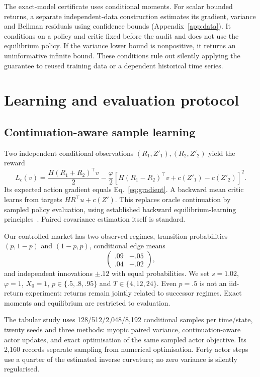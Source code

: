\documentclass[sigconf,anonymous,review]{acmart}
\begin{document}
The exact-model certificate uses conditional moments. For scalar bounded returns, a separate independent-data construction estimates its gradient, variance and Bellman residuals using confidence bounds (Appendix~\ref{app:data}). It conditions on a policy and critic fixed before the audit and does not use the equilibrium policy. If the variance lower bound is nonpositive, it returns an uninformative infinite bound. These conditions rule out silently applying the guarantee to reused training data or a dependent historical time series.

\section{Learning and evaluation protocol}
\subsection{Continuation-aware sample learning}
Two independent conditional observations $(R_1,Z'_1),(R_2,Z'_2)$ yield the reward
\begin{equation}\label{eq:paired}
 L_c(v)=\frac{H(R_1+R_2)^\top v}{2}
 -\frac\varphi2\left[H(R_1-R_2)^\top v+c(Z'_1)-c(Z'_2)\right]^2.
\end{equation}
Its expected action gradient equals Eq.~\eqref{eq:gradient}. A backward mean critic learns from targets $HR^\top u+c(Z')$. This replaces oracle continuation by sampled policy evaluation, using established backward equilibrium-learning principles~\cite{lesmana2025}. Paired covariance estimation itself is standard.

Our controlled market has two observed regimes, transition probabilities $(p,1-p)$ and $(1-p,p)$, conditional edge means
\[
 \begin{pmatrix}.09&-.05\\.04&-.02\end{pmatrix},
\]
and independent innovations $\pm.12$ with equal probabilities. We set $s=1.02$, $\varphi=1$, $X_0=1$, $p\in\{.5,.8,.95\}$ and $T\in\{4,12,24\}$. Even $p=.5$ is not an iid-return experiment: returns remain jointly related to successor regimes. Exact moments and equilibrium are restricted to evaluation.

The tabular study uses 128/512/2,048/8,192 conditional samples per time/state, twenty seeds and three methods: myopic paired variance, continuation-aware actor updates, and exact optimisation of the same sampled actor objective. Its 2,160 records separate sampling from numerical optimisation. Forty actor steps use a quarter of the estimated inverse curvature; no zero variance is silently regularised.
\end{document}
